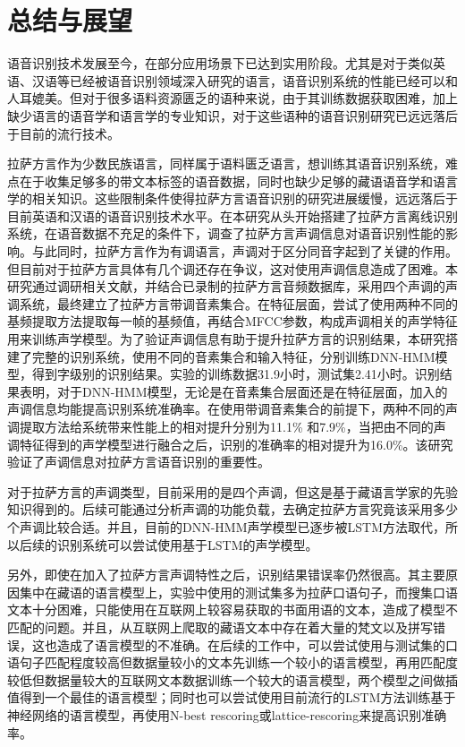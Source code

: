 
\chapter{总结与展望}
语音识别技术发展至今，在部分应用场景下已达到实用阶段。尤其是对于类似英语、汉语等已经被语音识别领域深入研究的语言，语音识别系统的性能已经可以和人耳媲美。但对于很多语料资源匮乏的语种来说，由于其训练数据获取困难，加上缺少语言的语音学和语言学的专业知识，对于这些语种的语音识别研究已远远落后于目前的流行技术。

拉萨方言作为少数民族语言，同样属于语料匮乏语言，想训练其语音识别系统，难点在于收集足够多的带文本标签的语音数据，同时也缺少足够的藏语语音学和语言学的相关知识。这些限制条件使得拉萨方言语音识别的研究进展缓慢，远远落后于目前英语和汉语的语音识别技术水平。在本研究从头开始搭建了拉萨方言离线识别系统，在语音数据不充足的条件下，调查了拉萨方言声调信息对语音识别性能的影响。与此同时，拉萨方言作为有调语言，声调对于区分同音字起到了关键的作用。但目前对于拉萨方言具体有几个调还存在争议，这对使用声调信息造成了困难。本研究通过调研相关文献，并结合已录制的拉萨方言音频数据库，采用四个声调的声调系统，最终建立了拉萨方言带调音素集合。在特征层面，尝试了使用两种不同的基频提取方法提取每一帧的基频值，再结合MFCC参数，构成声调相关的声学特征用来训练声学模型。为了验证声调信息有助于提升拉萨方言的识别结果，本研究搭建了完整的识别系统，使用不同的音素集合和输入特征，分别训练DNN-HMM模型，得到字级别的识别结果。实验的训练数据31.9小时，测试集2.41小时。识别结果表明，对于DNN-HMM模型，无论是在音素集合层面还是在特征层面，加入的声调信息均能提高识别系统准确率。在使用带调音素集合的前提下，两种不同的声调提取方法给系统带来性能上的相对提升分别为11.1\% 和7.9\%，当把由不同的声调特征得到的声学模型进行融合之后，识别的准确率的相对提升为16.0\%。该研究验证了声调信息对拉萨方言语音识别的重要性。

对于拉萨方言的声调类型，目前采用的是四个声调，但这是基于藏语言学家的先验知识得到的。后续可能通过分析声调的功能负载，去确定拉萨方言究竟该采用多少个声调比较合适。并且，目前的DNN-HMM声学模型已逐步被LSTM方法取代，所以后续的识别系统可以尝试使用基于LSTM的声学模型。

另外，即使在加入了拉萨方言声调特性之后，识别结果错误率仍然很高。其主要原因集中在藏语的语言模型上，实验中使用的测试集多为拉萨口语句子，而搜集口语文本十分困难，只能使用在互联网上较容易获取的书面用语的文本，造成了模型不匹配的问题。并且，从互联网上爬取的藏语文本中存在着大量的梵文以及拼写错误，这也造成了语言模型的不准确。在后续的工作中，可以尝试使用与测试集的口语句子匹配程度较高但数据量较小的文本先训练一个较小的语言模型，再用匹配度较低但数据量较大的互联网文本数据训练一个较大的语言模型，两个模型之间做插值得到一个最佳的语言模型；同时也可以尝试使用目前流行的LSTM方法训练基于神经网络的语言模型\cite{mikolov2010recurrent}，再使用N-best rescoring或lattice-rescoring来提高识别准确率\cite{mikolov2011strategies}。
